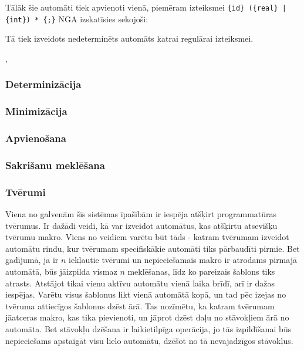 Tālāk šie automāti tiek apvienoti vienā, piemēram izteiksmei \verb/{id} ({real} | {int}) * {;}/ NGA izskatīsies sekojoši:

Tā tiek izveidots nedeterminēts automāts katrai regulārai izteiksmei.

\cite{Cox:RegexpMatchingFast}, \cite{DragonBook}

\subsubsection{Determinizācija}


\cite{DragonBook}

\subsubsection{\label{subsubsec:prototype_minimization}Minimizācija}

\subsubsection{Apvienošana}

\subsubsection{Sakrišanu meklēšana}

\subsubsection{Tvērumi}

Viena no galvenām šīs sistēmas īpašībām ir iespēja atšķirt programmatūras tvērumus. Ir dažādi veidi, kā var izveidot automātus, kas atšķirtu atsevišķu tvērumu makro. Viens no veidiem varētu būt tāds - katram tvērumam izveidot automātu rindu, kur tvērumam specifiskākie automāti tiks pārbaudīti pirmie. Bet gadījumā, ja ir $n$ iekļautie tvērumi un nepieciešamais makro ir atrodams pirmajā automātā, būs jāizpilda vismaz $n$ meklēšanas, līdz ko pareizais šablons tiks atrasts. Atstājot tikai vienu aktīvu automātu vienā laika brīdī, arī ir dažas iespējas. Varētu visus šablonus likt vienā automātā kopā, un tad pēc izejas no tvēruma attiecīgos šablonus dzēst ārā. Tas nozīmētu, ka katram tvērumam jāatceras makro, kas tika pievienoti, un jāprot dzēst daļu no stāvokļiem ārā no automāta. Bet stāvokļu dzēšana ir laikietilpīga operācija, jo tās izpildīšanai būs nepieciešams apstaigāt visu lielo automātu, dzēšot no tā nevajadzīgos stāvokļus.

